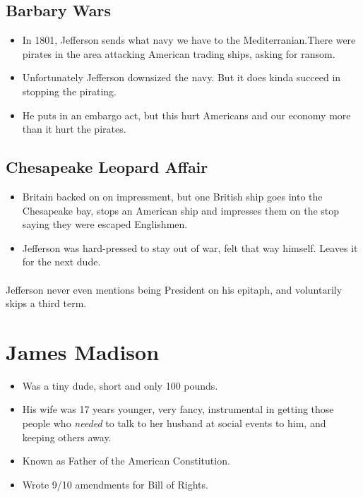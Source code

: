 \documentclass{article}
\begin{document}
      \subsection{Barbary Wars}
        \begin{itemize}
          \item In 1801, Jefferson sends what navy we have to the Mediterranian.There were pirates in the area attacking American trading ships, asking for ransom.
          \item Unfortunately Jefferson downsized the navy. But it does kinda succeed in stopping the pirating.
          \item He puts in an embargo act, but this hurt Americans and our economy more than it hurt the pirates.
        \end{itemize}

      \subsection{Chesapeake Leopard Affair}
        \begin{itemize}
          \item Britain backed on on impressment, but one British ship goes into the Chesapeake bay, stops an American ship and impresses them on the stop saying they were escaped Englishmen.
          \item Jefferson was hard-pressed to stay out of war, felt that way himself. Leaves it for the next dude.
        \end{itemize}

        \paragraph{} Jefferson never even mentions being President on his epitaph, and voluntarily skips a third term.


  \section{James Madison}
    \begin{itemize}
      \item Was a tiny dude, short and only 100 pounds.
      \item His wife was 17 years younger, very fancy, instrumental in getting those people who \emph{needed} to talk to her husband at social events to him, and keeping others away.
      \item Known as Father of the American Constitution.
      \item Wrote 9/10 amendments for Bill of Rights.
    \end{itemize}
\end{document}
